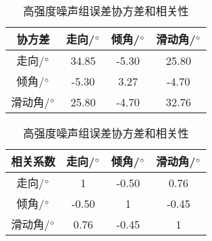 \begin{table}[ht]
\centering
\caption{高强度噪声组误差协方差和相关性}
\label{tab3_04}
    \begin{tabular}{c c c c}
    \hline
    协方差 & 走向/$^\circ$ & 倾角/$^\circ$ & 滑动角/$^\circ$ \\
    \hline
	走向/$^\circ$ 		&34.85	 	&-5.30		&25.80\\
	倾角/$^\circ$		&-5.30		&3.27		&-4.70\\
	滑动角/$^\circ$	&25.80		&-4.70		&32.76\\
    \hline
    \end{tabular}
    \begin{tabular}{c c c c}
    \hline
    相关系数 & 走向/$^\circ$ & 倾角/$^\circ$ & 滑动角/$^\circ$ \\
    \hline
	走向/$^\circ$ 		&1 			&-0.50		&0.76\\
	倾角/$^\circ$		&-0.50		&1			&-0.45\\
	滑动角/$^\circ$	&0.76		&-0.45		&1\\
    \hline
    \end{tabular}
\end{table}

